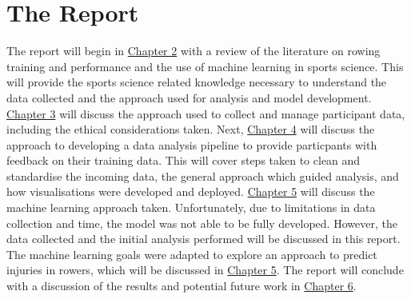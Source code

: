 \section{The Report}
The report will begin in \hyperref[ch:background]{Chapter 2} with a review of the literature on rowing training and performance and the use of machine learning in sports science. This will provide the sports science related knowledge necessary to understand the data collected and the approach used for analysis and model development. \hyperref[ch:data-collect-mng]{Chapter 3} will discuss the approach used to collect and manage participant data, including the ethical considerations taken. Next, \hyperref[ch:data-anyl-viz]{Chapter 4} will discuss the approach to developing a data analysis pipeline to provide particpants with feedback on their training data. This will cover steps taken to clean and standardise the incoming data, the general approach which guided analysis, and how visualisations were developed and deployed. \hyperref[ch:ml]{Chapter 5} will discuss the machine learning approach taken. Unfortunately, due to limitations in data collection and time, the model was not able to be fully developed. However, the data collected and the initial analysis performed will be discussed in this report. The machine learning goals were adapted to explore an approach to predict injuries in rowers, which will be discussed in \hyperref[ch:ml]{Chapter 5}. The report will conclude with a discussion of the results and potential future work in \hyperref[ch:discussion]{Chapter 6}.

